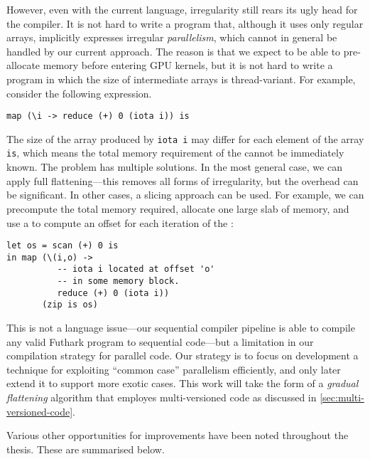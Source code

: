 However, even with the current language, irregularity still rears its
ugly head for the compiler.  It is not hard to write a program that,
although it uses only regular arrays, implicitly expresses irregular
\textit{parallelism}, which cannot in general be handled by our
current approach.  The reason is that we expect to be able to
pre-allocate memory before entering GPU kernels, but it is not hard to
write a program in which the size of intermediate arrays is
thread-variant.  For example, consider the following expression.
\begin{lstlisting}
map (\i -> reduce (+) 0 (iota i)) is
\end{lstlisting}
\noindent The size of the array produced by \lstinline{iota i} may
differ for each element of the array \texttt{is}, which means the
total memory requirement of the  cannot be immediately known.
The problem has multiple solutions.  In the most general case, we can
apply full flattening---this removes all forms of irregularity, but
the overhead can be significant.  In other cases, a slicing approach
can be used.  For example, we can precompute the total memory
required, allocate one large slab of memory, and use a  to
compute an offset for each iteration of the :
\begin{lstlisting}
let os = scan (+) 0 is
in map (\(i,o) ->
          -- iota i located at offset 'o'
          -- in some memory block.
          reduce (+) 0 (iota i))
       (zip is os)
\end{lstlisting}

This is not a language issue---our sequential compiler pipeline is
able to compile any valid Futhark program to sequential code---but a
limitation in our compilation strategy for parallel code.  Our
strategy is to focus on development a technique for exploiting
``common case'' parallelism efficiently, and only later extend it to
support more exotic cases.  This work will take the form of a
\textit{gradual flattening} algorithm that employes multi-versioned
code as discussed in \cref{sec:multi-versioned-code}.

Various other opportunities for improvements have been noted
throughout the thesis.  These are summarised below.

